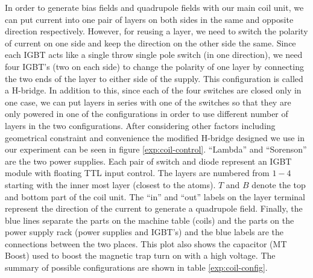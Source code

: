In order to generate bias fields and quadrupole fields with our main coil unit, we can put current into one pair of layers on both sides in the same and opposite direction respectively. However, for reusing a layer, we need to switch the polarity of current on one side and keep the direction on the other side the same. Since each IGBT acts like a single throw single pole switch (in one direction), we need four IGBT's (two on each side) to change the polarity of one layer by connecting the two ends of the layer to either side of the supply. This configuration is called a H-bridge. In addition to this, since each of the four switches are closed only in one case, we can put layers in series with one of the switches so that they are only powered in one of the configurations in order to use different number of layers in the two configurations. After considering other factors including geometrical constraint and convenience the modified H-bridge designed we use in our experiment can be seen in figure \ref{exp:coil-control}. ``Lambda'' and ``Sorenson'' are the two power supplies. Each pair of switch and diode represent an IGBT module with floating TTL input control. The layers are numbered from $1-4$ starting with the inner most layer (closest to the atoms). $T$ and $B$ denote the top and bottom part of the coil unit. The ``in'' and ``out'' labels on the layer terminal represent the direction of the current to generate a quadrupole field. Finally, the blue lines separate the parts on the machine table (coils) and the parts on the power supply rack (power supplies and IGBT's) and the blue labels are the connections between the two places. This plot also shows the capacitor (MT Boost) used to boost the magnetic trap turn on with a high voltage. The summary of possible configurations are shown in table \ref{exp:coil-config}.

